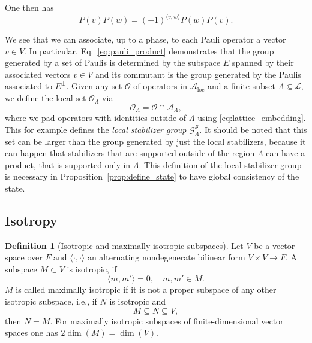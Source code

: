 \documentclass[aps,pra,reprint,superscriptaddress]{revtex4-2}
\newcommand{\cA}{{\mathcal A}}
\newcommand{\cG}{{\mathcal G}}
\newcommand{\cL}{{\mathcal L}}
\newcommand{\cO}{{\mathcal O}}
\newcommand{\cS}{{\mathcal S}}
\renewcommand\L{\Lambda}
\theoremstyle{definition}
\newtheorem{definition}[theorem]{Definition}
\theoremstyle{remark}
\begin{document}
One then has   
\begin{equation}\label{eq:pauli_commutation}
  P(v)P(w)=(-1)^{\langle v,w\rangle}P(w)P(v).
  \end{equation}

We see that we can associate, up to a phase, to each Pauli operator a vector $v
\in V$. In particular, Eq.~\eqref{eq:pauli_product} demonstrates that the group
generated by a set of Paulis is determined by the subspace $E$ spanned by their
associated vectors $v \in V$ and its commutant is the group generated by the
Paulis associated to $E^\perp$.
Given any set $\cO$ of operators in $\cA_{\text{loc}}$ and a finite subset $\L
\Subset \cL$, we define the local set $\cO_\L$
via 
\begin{equation}
    \cO_\L = \cO \cap \cA_\L,
\end{equation}
where we pad operators with identities outside of $\L$ using
\eqref{eq:lattice_embedding}. This for example defines the \emph{local
stabilizer group} $\cG^{\cS}_{\L}$. It should be noted that this set can be
larger than the group generated by just the local stabilizers, because it can
happen that stabilizers that are supported outside of the region $\L$ can have
a product, that is supported only in $\L$. This definition of the local
stabilizer group is necessary in Proposition~\ref{prop:define_state} to have global
consistency of the state. 


\subsection{Isotropy}
\begin{definition}[Isotropic and maximally isotropic subspaces]
    Let $V$ be a vector space over $F$ and $\langle\cdot,\cdot \rangle$ an
    alternating nondegenerate bilinear form $V \times V
    \rightarrow F$. A subspace $M \subset V$ is isotropic, if 
    \begin{equation}
         \langle m,m'\rangle = 0, \quad m,m' \in M.
    \end{equation}
    $M$ is called maximally isotropic if it is not a proper subspace of any other isotropic subspace, i.e., if $N$ is isotropic and 
    \begin{equation}
        M \subseteq N \subseteq V,
    \end{equation}
    then $N=M$. For maximally isotropic subspaces of
    finite-dimensional vector spaces one has $2 \dim(M) = \dim(V)$. 
\end{definition}
\end{document}
